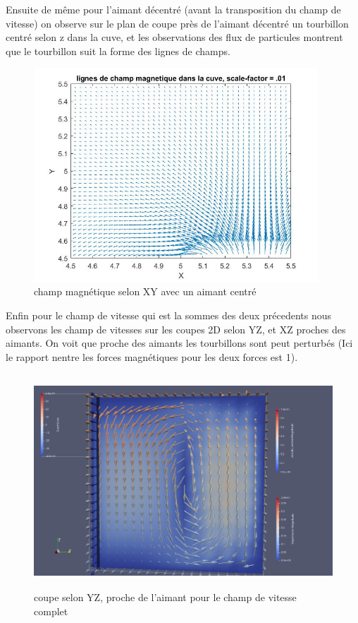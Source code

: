 \documentclass[a4paper,12pt,titlepage]{report}
\begin{document}
\begin{onehalfspace}
Ensuite de même pour l'aimant décentré (avant la transposition du champ de vitesse) on observe
sur le plan de coupe près de l'aimant décentré un tourbillon centré selon z dans la cuve, et les observations des flux de particules montrent que le tourbillon suit la forme des lignes de champs. \\



\begin{figure}[!h]
\begin{center}
\includegraphics[height = 8cm, keepaspectratio]{graphes/coupe_2D_champ_decentre.jpg} 
\caption{\label{figure 39 } champ magnétique selon XY avec un aimant centré}
\end{center}
\end{figure}

\newpage
Enfin pour le champ de vitesse qui est la sommes des deux précedents nous observons les champ de vitesses sur les coupes 2D selon YZ, et XZ proches des aimants.  On voit que proche des aimants les tourbillons sont peut perturbés (Ici le rapport nentre les forces magnétiques pour les deux forces est 1).
\newpage
\begin{figure}[!h]
\center 
\includegraphics[height = 8cm, keepaspectratio]{graphes/Paraview/total_coupe_pret_aimant_decentre.png} 
\caption{coupe selon YZ, proche de l'aimant pour le champ de vitesse complet}
\label{figure 322}
\end{figure}


\end{onehalfspace}
\end{document}
